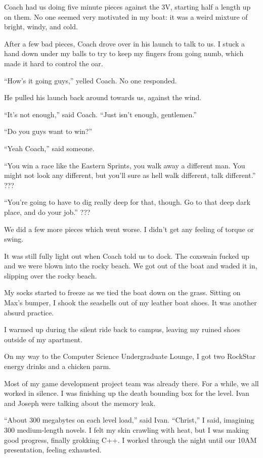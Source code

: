 Coach had us doing five minute pieces against the 3V, starting half a
length up on them.  No one seemed very motivated in my boat: it was a weird
mixture of bright, windy, and cold. 

After a few bad pieces, Coach drove over in his launch to talk to us.  I stuck a
hand down under my balls to try to keep my fingers from going numb, which made
it hard to control the oar.

``How's it going guys,'' yelled Coach.  No one responded.

He pulled his launch back around towards us, against the wind.

``It's not enough,'' said Coach.  ``Just isn't enough, gentlemen.''

``Do you guys want to win?''

``Yeah Coach,'' said someone.

``You win a race like the Eastern Sprints, you walk away a different man.  You
might not look any different, but you'll sure as hell walk different, talk
different.'' ???

``You're going to have to dig really deep for that, though.  Go to that deep
dark place, and do your job.''  ???

We did a few more pieces which went worse.  I didn't get any feeling of torque
or swing.  

It was still fully light out when Coach told us to dock.  The coxswain fucked up
and we were blown into the rocky beach.  We got out of the boat and waded it in,
slipping over the rocky beach. 

My socks started to freeze as we tied the boat down on the grass.  Sitting on
Max's bumper, I shook the seashells out of my leather boat shoes.  It was
another absurd practice.  

I warmed up during the silent ride back to campus, leaving my ruined shoes
outside of my apartment.  

On my way to the Computer Science Undergraduate Lounge, I got two RockStar
energy drinks and a chicken parm.

Most of my game development project team was already there.  For a while, we all
worked in silence.  I was finishing up the death bounding box for the level.
Ivan and Joseph were talking about the memory leak.

``About 300 megabytes on each level load,'' said Ivan.  ``Christ,'' I said,
imagining 300 medium-length novels.  I felt my skin crawling with heat, but I
was making good progress, finally grokking C++.  I worked through the night
until our 10AM presentation, feeling exhausted.

